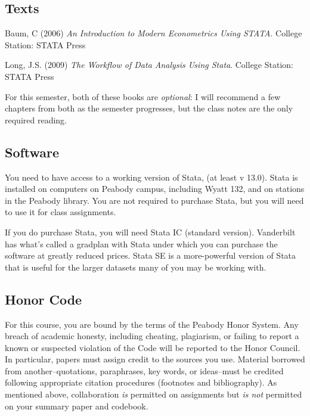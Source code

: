 \documentclass[12pt]{article}
\begin{document}
\subsection{Texts}%

\begin{flushleft}

Baum, C (2006) \textit{An Introduction to Modern Econometrics Using
STATA}. College Station: STATA Press

Long, J.S. (2009) \textit{The Workflow of Data Analysis Using Stata}. College Station: STATA Press

For this semester, both of these books are \textit{optional}: I will
recommend a few chapters from both as the semester progresses, but the
class notes are the only required reading. 

\end{flushleft}

\subsection{Software}

You need to have access to a working version of Stata, (at least v
13.0).  Stata is installed on computers on Peabody campus, including
Wyatt 132, and on stations in the Peabody library. You are not
required to purchase Stata, but you will need to use it for class
assignments.

If you do purchase Stata, you will need Stata IC (standard
version). Vanderbilt has what's called a gradplan with Stata under
which you can purchase the software at greatly reduced prices.  Stata
SE is a more-powerful version of Stata that is useful for the larger
datasets many of you may be working with.


\subsection{Honor Code}
\label{sec:honor-code}

For this course, you are bound by the terms of the Peabody Honor
System. Any breach of academic honesty, including cheating,
plagiarism, or failing to report a known or suspected violation of the
Code will be reported to the Honor Council. In particular, papers must
assign credit to the sources you use. Material borrowed from
another--quotations, paraphrases, key words, or ideas--must be
credited following appropriate citation procedures (footnotes and
bibliography). As mentioned above, collaboration \textit{is} permitted
on assignments but \textit{is not} permitted on your summary paper and
codebook. 
 
\end{document}
